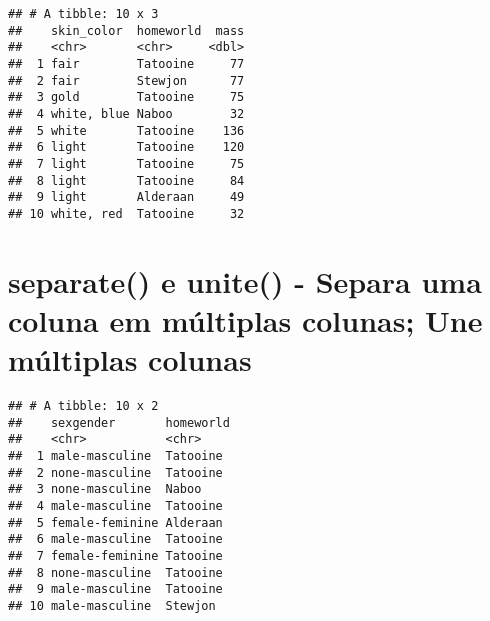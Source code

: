 \documentclass[]{book}
\newenvironment{Shaded}{\begin{snugshade}}{\end{snugshade}}
\newcommand{\DataTypeTok}[1]{\textcolor[rgb]{0.13,0.29,0.53}{#1}}
\newcommand{\DecValTok}[1]{\textcolor[rgb]{0.00,0.00,0.81}{#1}}
\newcommand{\KeywordTok}[1]{\textcolor[rgb]{0.13,0.29,0.53}{\textbf{#1}}}
\newcommand{\NormalTok}[1]{#1}
\newcommand{\OperatorTok}[1]{\textcolor[rgb]{0.81,0.36,0.00}{\textbf{#1}}}
\newcommand{\StringTok}[1]{\textcolor[rgb]{0.31,0.60,0.02}{#1}}
\begin{document}
\begin{verbatim}
## # A tibble: 10 x 3
##    skin_color  homeworld  mass
##    <chr>       <chr>     <dbl>
##  1 fair        Tatooine     77
##  2 fair        Stewjon      77
##  3 gold        Tatooine     75
##  4 white, blue Naboo        32
##  5 white       Tatooine    136
##  6 light       Tatooine    120
##  7 light       Tatooine     75
##  8 light       Tatooine     84
##  9 light       Alderaan     49
## 10 white, red  Tatooine     32
\end{verbatim}

\hypertarget{separate-e-unite---separa-uma-coluna-em-muxfaltiplas-colunas-une-muxfaltiplas-colunas}{%
\section{separate() e unite() - Separa uma coluna em múltiplas colunas; Une múltiplas colunas}\label{separate-e-unite---separa-uma-coluna-em-muxfaltiplas-colunas-une-muxfaltiplas-colunas}}

\begin{Shaded}
\end{Shaded}

\begin{verbatim}
## # A tibble: 10 x 2
##    sexgender       homeworld
##    <chr>           <chr>    
##  1 male-masculine  Tatooine 
##  2 none-masculine  Tatooine 
##  3 none-masculine  Naboo    
##  4 male-masculine  Tatooine 
##  5 female-feminine Alderaan 
##  6 male-masculine  Tatooine 
##  7 female-feminine Tatooine 
##  8 none-masculine  Tatooine 
##  9 male-masculine  Tatooine 
## 10 male-masculine  Stewjon
\end{verbatim}

\begin{Shaded}
\end{Shaded}
\end{document}
